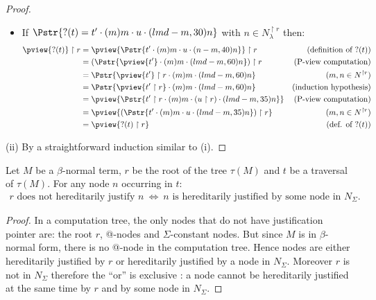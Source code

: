 \begin{proof}
\begin{itemize}
\item If $\Pstr{ ?(t) =  t' \cdot (m){m} \cdot u \cdot (lmd-m,30){n} }$ with $n\in N^{\upharpoonright r}_\lambda$ then:
        \begin{align*}
        \pview{?(t)} \upharpoonright  r
        &= \pview{\Pstr{t' \cdot (m){m} \cdot u \cdot (n-m,40){n}}} \upharpoonright  r
                                                              & (\mbox{definition of } ?(t))\\
        &= (\Pstr{\pview{t'} \cdot (m){m} \cdot  (lmd-m,60){n}}) \upharpoonright  r
                                                              & (\mbox{P-view computation}) \\
        &= \Pstr{ \pview{t'} \upharpoonright  r \cdot (m){m} \cdot  (lmd-m,60){n} }
                                                              & (m, n \in N^{\upharpoonright r}) \\
        &= \Pstr{ \pview{t'\upharpoonright r}  \cdot (m){m} \cdot  (lmd-m,60){n} }
                                                              & \mbox{(induction hypothesis)} \\
        &= \pview{ \Pstr{t' \upharpoonright r \cdot (m){m} \cdot {(u \upharpoonright r)} \cdot (lmd-m,35){n}}}
                                                           & (\mbox{P-view computation}) \\
        &= \pview{ (\Pstr{t' \cdot (m){m} \cdot u \cdot (lmd-m,35){n}}) \upharpoonright r }
                                                           & (m, n \in N^{\upharpoonright r}) \\
        &= \pview{ ?(t) \upharpoonright r }                & \mbox{(def. of $?(t)$)}
        \end{align*}
\end{itemize}
(ii) By a straightforward induction similar to (i).
\end{proof}

\begin{lemma}
\label{lem:betaeta_trav}
Let $M$ be a $\beta$-normal term, $r$ be the root of the tree $\tau(M)$ and
$t$ be a traversal of $\tau(M)$.
For any node $n$ occurring in $t$:
\begin{eqnarray*}
r \mbox{ does not hereditarily justify } n  \  \iff \   n \mbox{ is
hereditarily justified by some node in } N_\Sigma.
\end{eqnarray*}
\end{lemma}
\begin{proof}
 In a computation tree, the only nodes that do not have justification pointer are:
the root $r$, @-nodes and $\Sigma$-constant nodes. But since $M$ is
in $\beta$-normal form, there is no @-node in the computation tree.
Hence nodes are either hereditarily justified by $r$ or hereditarily
justified by a node in $N_\Sigma$. Moreover $r$ is not in $N_\Sigma$
therefore the ``or'' is exclusive : a node cannot be hereditarily
justified at the same time by $r$ and by some node in $N_\Sigma$.
\end{proof}


